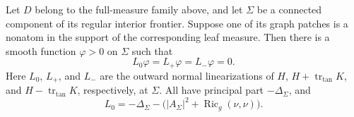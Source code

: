 \begin{lemma}\label{var:common-jacobi}
Let $D$ belong to the full-measure family above, and let $\Sigma$ be a
connected component of its regular interior frontier.  Suppose one of its
graph patches is a nonatom in the support of the corresponding leaf
measure.  Then there is a smooth function $\varphi>0$ on $\Sigma$ such
that
\begin{equation}\label{var:three-jacobi-equations}
 L_0\varphi=L_+\varphi=L_-\varphi=0.
\end{equation}
Here $L_0$, $L_+$, and $L_-$ are the outward normal linearizations of
$H$, $H+\operatorname{tr}_{\mathrm{tan}}K$, and
$H-\operatorname{tr}_{\mathrm{tan}}K$, respectively, at $\Sigma$.
All have principal part $-\Delta_\Sigma$, and
\begin{equation}\label{var:minimal-jacobi}
 L_0=-\Delta_\Sigma-
       \bigl(|A_\Sigma|^2+\operatorname{Ric}_g(\nu,\nu)\bigr).
\end{equation}
\end{lemma}

